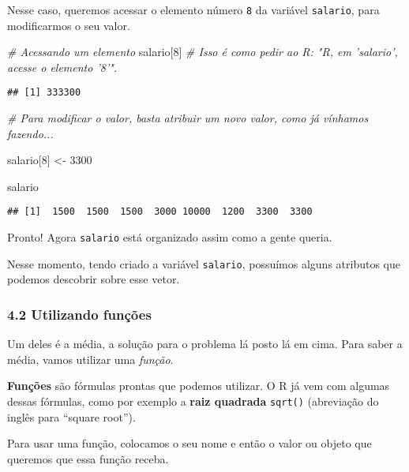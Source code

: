 \documentclass[
]{article}
\newenvironment{Shaded}{\begin{snugshade}}{\end{snugshade}}
\newcommand{\CommentTok}[1]{\textcolor[rgb]{0.56,0.35,0.01}{\textit{#1}}}
\newcommand{\DecValTok}[1]{\textcolor[rgb]{0.00,0.00,0.81}{#1}}
\newcommand{\NormalTok}[1]{#1}
\newcommand{\StringTok}[1]{\textcolor[rgb]{0.31,0.60,0.02}{#1}}
\begin{document}
Nesse caso, queremos acessar o elemento número \texttt{8} da variável
\texttt{salario}, para modificarmos o seu valor.

\begin{Shaded}
\begin{Highlighting}[]
\CommentTok{# Acessando um elemento}
\NormalTok{salario[}\DecValTok{8}\NormalTok{]  }\CommentTok{# Isso é como pedir ao R: "R, em 'salario', acesse o elemento '8'".}
\end{Highlighting}
\end{Shaded}

\begin{verbatim}
## [1] 333300
\end{verbatim}

\begin{Shaded}
\begin{Highlighting}[]
\CommentTok{# Para modificar o valor, basta atribuir um novo valor, como já vínhamos fazendo...}

\NormalTok{salario[}\DecValTok{8}\NormalTok{] <-}\StringTok{ }\DecValTok{3300}

\NormalTok{salario}
\end{Highlighting}
\end{Shaded}

\begin{verbatim}
## [1]  1500  1500  1500  3000 10000  1200  3300  3300
\end{verbatim}

Pronto! Agora \texttt{salario} está organizado assim como a gente
queria.

Nesse momento, tendo criado a variável \texttt{salario}, possuímos
alguns atributos que podemos descobrir sobre esse vetor.

\hypertarget{utilizando-funuxe7uxf5es}{%
\subsubsection{4.2 Utilizando funções}\label{utilizando-funuxe7uxf5es}}

Um deles é a média, a solução para o problema lá posto lá em cima. Para
saber a média, vamos utilizar uma \emph{função}.

\textbf{Funções} são fórmulas prontas que podemos utilizar. O R já vem
com algumas dessas fórmulas, como por exemplo a \textbf{raiz quadrada}
\texttt{sqrt()} (abreviação do inglês para ``square root'').

Para usar uma função, colocamos o seu nome e então o valor ou objeto que
queremos que essa função receba.
\end{document}
